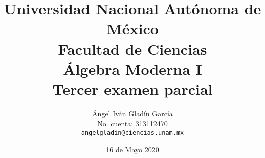 \documentclass[letterpaper]{article}
\begin{document}
\title{
    \vspace{-2.75em}
        Universidad Nacional Autónoma de México\\
        Facultad de Ciencias\\
        Álgebra Moderna I\\
    \vspace{.5cm}
    \large
        \textbf{Tercer examen parcial}
}
\author{
    Ángel Iván Gladín García\\
    No. cuenta: 313112470\\
    \texttt{angelgladin@ciencias.unam.mx}
}
\date{16 de Mayo 2020}
\maketitle

\newtheorem{theorem}{Teorema}
\newtheorem{example}{Ejemplo}
\newtheorem{corollary}{Corolario}
\newtheorem{lemma}{Lemma}
\newtheorem{definition}{Definicion}
\newtheorem{prop}{Proposicion}
\end{document}
